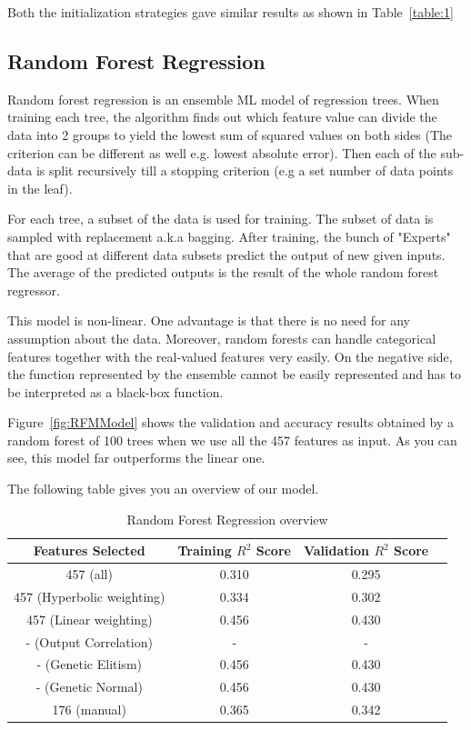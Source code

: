 \documentclass[11pt]{article}
\begin{document}
Both the initialization strategies gave similar results as shown in Table~\ref{table:1}

\subsection{Random Forest Regression}
Random forest regression is an ensemble ML model of regression trees.
When training each tree,  the algorithm finds out which feature value can divide the data into 2 groups to yield the lowest sum of squared values on both sides (The criterion can be different as well e.g. lowest absolute error).
Then each of the sub-data is split recursively till a stopping criterion (e.g a set number of data points in the leaf).

For each tree,  a subset of the data is used for training. 
The subset of data is sampled with replacement a.k.a bagging.
After training,  the bunch of "Experts" that are good at different data subsets predict the output of new given inputs.
The average of the predicted outputs is the result of the whole random forest regressor.

This model is non-linear.
One advantage is that there is no need for any assumption about the data.
Moreover,  random forests can handle categorical features together with the real-valued features very easily.
On the negative side,  the function represented by the ensemble cannot be easily represented and has to be interpreted as a black-box function.

Figure~\ref{fig:RFMModel} shows the validation and accuracy results obtained by a random forest of 100 trees when we use all the 457 features as input.
As you can see,  this model far outperforms the linear one.

The following table gives you an overview of our model.

\begin{table} [h!]
\centering
 \begin{tabular}{ | c | c | c | c | }
\hline
\textbf{Features Selected} & \textbf{Training $R^2$ Score} & \textbf{Validation $R^2$ Score} \\ [0.5 ex]
\hline \hline
457 (all) & 0.310 & 0.295\\
457 (Hyperbolic weighting) & 0.334 & 0.302\\
457 (Linear weighting) & 0.456 & 0.430 \\
- (Output Correlation)\footnotemark[1] & - & -  \\ 
- (Genetic Elitism) & 0.456 & 0.430 \\
- (Genetic Normal) & 0.456 & 0.430 \\
176 (manual) & 0.365  & 0.342  \\ [1ex]
\hline
\end{tabular}
\caption{Random Forest Regression overview}
\label {table:3}
\end{table}
\end{document}
